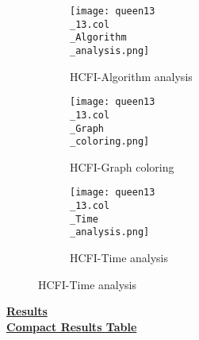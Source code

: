 \documentclass[10pt]{article}
\begin{document}
\graphicspath{{./Core1/Solutions/HCFI/queen13\_13.col}}
\begin{figure}[H]
\begin{subfigure}{.33\textwidth}
  \centering
  \texttt{[image: queen13\\\_13.col\\\_Algorithm\\\_analysis.png]}
  \caption{HCFI-Algorithm analysis}
   \label{fig:subfig1}
\end{subfigure}%
\begin{subfigure}{.33\textwidth}
  \centering
  \texttt{[image: queen13\\\_13.col\\\_Graph\\\_coloring.png]}
  \caption{HCFI-Graph coloring}
  \label{fig:subfig2}
\end{subfigure}
\begin{subfigure}{.33\textwidth}
  \centering
  \texttt{[image: queen13\\\_13.col\\\_Time\\\_analysis.png]}
  \caption{HCFI-Time analysis}
  \end{subfigure}
\end{figure}
\vspace{2cm}
\begin{center}
\hyperlink{page.8}{\textbf{Results}}\\
\vspace{0.5cm}
\hyperlink{page.71}{\textbf{Compact Results Table}}
\end{center}
\pagebreak
\end{document}
